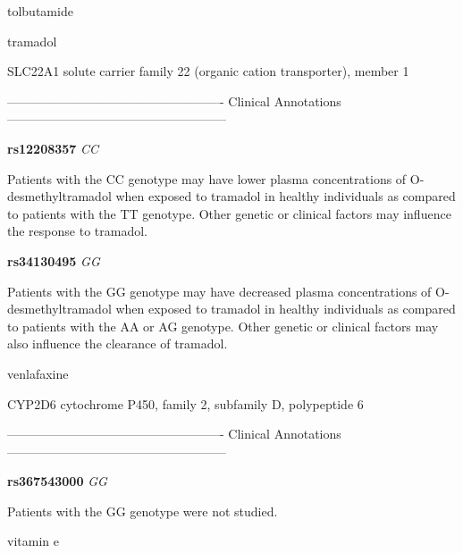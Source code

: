 \documentclass{resume} %
\begin{document}
\begin{rSection}{ tolbutamide }
\end{rSection}\begin{rSection}{ tramadol }
\item[]

\begin{rSubsection}{ SLC22A1 }{ solute carrier family 22 (organic cation transporter), member 1 }{}{}
\item[]

\item[] ---------------------------------------------------- Clinical Annotations -----------------------------------------------------\newline
\item \textbf{ rs12208357 } \textit{ CC }
\item[] Patients with the CC genotype may have lower plasma concentrations of O-desmethyltramadol when exposed to tramadol in healthy individuals as compared to patients with the TT genotype. Other genetic or clinical factors may influence the response to tramadol.\item \textbf{ rs34130495 } \textit{ GG }
\item[] Patients with the GG genotype may have decreased plasma concentrations of O-desmethyltramadol when exposed to tramadol in healthy individuals as compared to patients with the AA or AG genotype. Other genetic or clinical factors may also influence the clearance of tramadol.
\end{rSubsection}

\end{rSection}\begin{rSection}{ venlafaxine }
\item[]

\begin{rSubsection}{ CYP2D6 }{ cytochrome P450, family 2, subfamily D, polypeptide 6 }{}{}
\item[]

\item[] ---------------------------------------------------- Clinical Annotations -----------------------------------------------------\newline
\item \textbf{ rs367543000 } \textit{ GG }
\item[] Patients with the GG genotype were not studied.
\end{rSubsection}

\end{rSection}\begin{rSection}{ vitamin e }
\item[]


\end{rSection}
\end{document}
